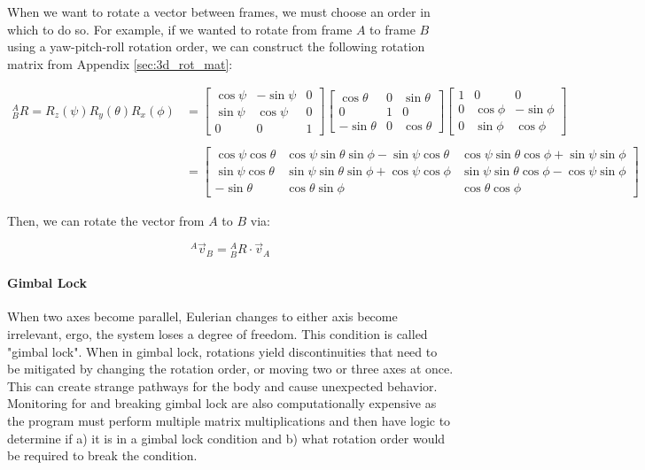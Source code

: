 When we want to rotate a vector between frames, we must choose an order in which to do so.
For example, if we wanted to rotate from frame $A$ to frame $B$ using a yaw-pitch-roll rotation order, we can construct the following rotation matrix from Appendix \ref{sec:3d_rot_mat}:

\begin{align*}
    {}^A_B R = R_z(\psi) R_y(\theta) R_x(\phi) &= \left[
        \begin{matrix}
            \cos\psi & -\sin\psi & 0 \\
            \sin\psi & \cos\psi & 0 \\
            0 & 0 & 1
        \end{matrix}\right]
        \left[\begin{matrix}
            \cos\theta & 0 & \sin\theta \\
            0 & 1 & 0 \\
            -\sin\theta & 0 & \cos\theta
        \end{matrix}\right]
        \left[\begin{matrix}
            1 & 0 & 0 \\
            0 & \cos\phi & -\sin\phi \\
            0 & \sin\phi & \cos\phi 
        \end{matrix}\right] \\ \\
        &= \left[\begin{matrix}
            \cos\psi\cos\theta & \cos\psi\sin\theta\sin\phi-\sin\psi\cos\theta & \cos\psi\sin\theta\cos\phi+\sin\psi\sin\phi \\
            \sin\psi\cos\theta & \sin\psi\sin\theta\sin\phi+\cos\psi\cos\phi & \sin\psi\sin\theta\cos\phi-\cos\psi\sin\phi \\
            -\sin\theta & \cos\theta\sin\phi & \cos\theta\cos\phi
        \end{matrix}\right]
\end{align*}

Then, we can rotate the vector from $A$ to $B$ via:

\begin{equation*}
    {}^A\vec{v}_B = {}^A_B R \cdot \vec{v}_A
\end{equation*}

\paragraph*{Gimbal Lock} \label{par:gimbal_lock}
When two axes become parallel, Eulerian changes to either axis become irrelevant, ergo, the system loses a degree of freedom.
This condition is called "gimbal lock".
When in gimbal lock, rotations yield discontinuities that need to be mitigated by changing the rotation order, or moving two or three axes at once.
This can create strange pathways for the body and cause unexpected behavior.
Monitoring for and breaking gimbal lock are also computationally expensive as the program must perform multiple matrix multiplications and then have logic to determine if a) it is in a gimbal lock condition and b) what rotation order would be required to break the condition.

